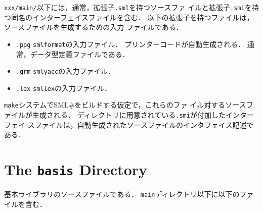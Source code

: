 \documentclass{jbook}
\newif\ifjp
\newcommand{\txt}[2]{#2}
\newcommand{\smlsharp}{SML\#}
\newcommand{\code}[1]{\mbox{\large\tt #1}}
\begin{document}
	\code{xxx/main/}以下には，通常，拡張子\code{.sml}を持つソースファ
イルと拡張子\code{.smi}を持つ同名のインターフェイスファイルを含む．
	以下の拡張子を持つファイルは，ソースファイルを生成するための入力
ファイルである．
\begin{itemize}
\item \code{.ppg} \code{smlformat}の入力ファイル．
	プリンターコードが自動生成される．
	通常，データ型定義ファイルである．
\item \code{.grm} \code{smlyacc}の入力ファイル．
\item \code{.lex} \code{smllex}の入力ファイル．
\end{itemize}
	\code{make}システムで\smlsharp{}をビルドする仮定で，これらのファ
イル対するソースファイルが生成される．
	ディレクトリに用意されている\code{.smi}が付加したインターフェイ
スファイルは，自動生成されたソースファイルのインタフェイス記述である．
\fi%

\section{\txt{\code{basis}ディレクトリ}{The \code{basis} Directory}}
\ifjp%
	基本ライブラリのソースファイルである．
	\code{main}ディレクトリ以下に以下のファイルを含む．
\end{document}
